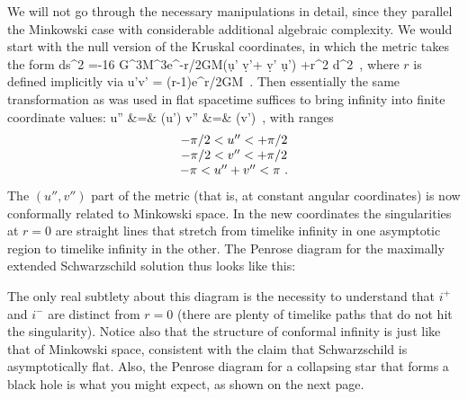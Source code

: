 We will not go through the necessary manipulations
in detail, since they parallel the Minkowski case with
considerable additional algebraic complexity.  We would
start with the null version of the Kruskal coordinates, in
which the metric takes the form
\be
  ds^2 =-{{16 G^3M^3}}e^{-r/2GM}(\d u' \d v'+ \d v' \d u')
  +r^2 d\Omega^2\ ,  \label{7.103}
\ee
where $r$ is defined implicitly via
\be
  u'v' = \left({{r}}-1\right)e^{r/2GM}\ .
  \label{7.104}
\ee
Then essentially the same transformation as was used in
flat spacetime suffices to bring infinity into finite
coordinate values:
\bea
  u'' &=&  \arctan\left({{u'}}\right)\cr
  v'' &=&  \arctan\left({{v'}}\right)\ ,
  \label{7.105}
\eea
with ranges
\[\begin{array}{c}
  -\pi/2 < u'' < +\pi/2\cr -\pi/2 < v'' < +\pi/2\cr
  -\pi < u'' + v'' < \pi\ .
\end{array}\]
The $(u'',v'')$ part of the metric (that is, at constant angular
coordinates) is now conformally related to Minkowski space.
In the new coordinates the singularities
at $r=0$ are straight lines that stretch from timelike
infinity in one asymptotic region to timelike infinity in the 
other.  The Penrose diagram for the maximally extended 
Schwarzschild solution thus looks like this:

\begin{figure}[h]
  \centerline{
  }
\end{figure}

\noindent  The only real subtlety about this diagram is
the necessity to understand that $i^+$ and $i^-$ are distinct
from $r=0$ (there are plenty of timelike paths that do not
hit the singularity).  Notice also that the structure of
conformal infinity is just like that of Minkowski space,
consistent with the claim that Schwarzschild is asymptotically
flat.  Also, the Penrose diagram for a collapsing star that
forms a black hole is what you might expect, as shown on the
next page.

\begin{figure}
  \centerline{
  }
\end{figure}

